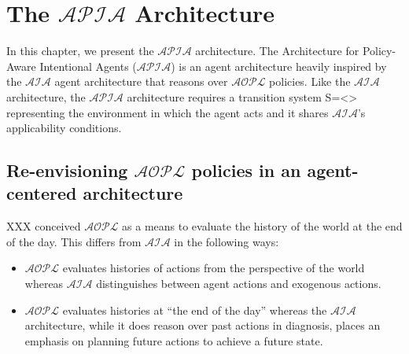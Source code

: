 \chapter{The $\mathcal{APIA}$ Architecture}

%
%
%
%
%
%

In this chapter, we present the $\mathcal{APIA}$ architecture.
The Architecture for Policy-Aware Intentional Agents ($\mathcal{APIA}$) is an agent architecture heavily inspired by the $\mathcal{AIA}$ agent architecture that reasons over $\mathcal{AOPL}$ policies.
Like the $\mathcal{AIA}$ architecture, the $\mathcal{APIA}$ architecture requires a transition system S=<> representing the environment in which the agent acts and it shares $\mathcal{AIA}$'s applicability conditions.

\section{Re-envisioning $\mathcal{AOPL}$ policies in an agent-centered architecture}

XXX conceived $\mathcal{AOPL}$ as a means to evaluate the history of the world at the end of the day.
This differs from $\mathcal{AIA}$ in the following ways:

\begin{itemize}
    \item $\mathcal{AOPL}$ evaluates histories of actions from the perspective of the world whereas $\mathcal{AIA}$ distinguishes between agent actions and exogenous actions.
    \item $\mathcal{AOPL}$ evaluates histories at ``the end of the day'' whereas the $\mathcal{AIA}$ architecture, while it does reason over past actions in diagnosis, places an emphasis on planning future actions to achieve a future state.
\end{itemize}

